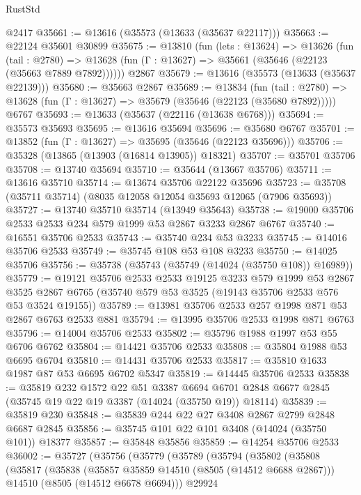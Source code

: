 \begin{lexlean}{RustStd}
\begin{coremodule}
    @2417
@35661 := @13616 (@35573 (@13633 (@35637 @22117)))
@35663 := @22124 @35601 @30899
@35675 := @13810
    (fun (lets : @13624) =>
    @13626
      (fun (tail : @2780) =>
      @13628 (fun (Γ : @13627) => @35661 (@35646 (@22123 (@35663 @7889 @7892))))))
    @2867
@35679 := @13616 (@35573 (@13633 (@35637 @22139)))
@35680 := @35663 @2867
@35689 := @13834
    (fun (tail : @2780) => @13628 (fun (Γ : @13627) => @35679 (@35646 (@22123 (@35680 @7892)))))
    @6767
@35693 := @13633 (@35637 (@22116 (@13638 @6768)))
@35694 := @35573 @35693
@35695 := @13616 @35694
@35696 := @35680 @6767
@35701 := @13852 (fun (Γ : @13627) => @35695 (@35646 (@22123 @35696)))
@35706 := @35328 (@13865 (@13903 (@16814 @13905)) @18321)
@35707 := @35701 @35706
@35708 := @13740 @35694
@35710 := @35644 (@13667 @35706)
@35711 := @13616 @35710
@35714 := @13674 @35706 @22122 @35696
@35723 := @35708 (@35711 @35714) (@8035 @12058 @12054 @35693 @12065 (@7906 @35693))
@35727 := @13740 @35710 @35714 (@13949 @35643)
@35738 := @19000 @35706 @2533 @2533 @234 @579 @1999 @53 @2867 @3233 @2867 @6767
@35740 := @16551 @35706 @2533
@35743 := @35740 @234 @53 @3233
@35745 := @14016 @35706 @2533
@35749 := @35745 @108 @53 @108 @3233
@35750 := @14025 @35706
@35756 := @35738 (@35743 (@35749 (@14024 (@35750 @108)) @16989))
@35779 := @19121
    @35706
    @2533
    @2533
    @19125
    @3233
    @579
    @1999
    @53
    @2867
    @3525
    @2867
    @6765
    (@35740 @579 @53 @3525 (@19143 @35706 @2533 @576 @53 @3524 @19155))
@35789 := @13981 @35706 @2533 @257 @1998 @871 @53 @2867 @6763 @2533 @881
@35794 := @13995 @35706 @2533 @1998 @871 @6763
@35796 := @14004 @35706 @2533
@35802 := @35796 @1988 @1997 @53 @55 @6706 @6762
@35804 := @14421 @35706 @2533
@35808 := @35804 @1988 @53 @6695 @6704
@35810 := @14431 @35706 @2533
@35817 := @35810 @1633 @1987 @87 @53 @6695 @6702 @5347
@35819 := @14445 @35706 @2533
@35838 := @35819
    @232
    @1572
    @22
    @51
    @3387
    @6694
    @6701
    @2848
    @6677
    @2845
    (@35745 @19 @22 @19 @3387 (@14024 (@35750 @19)) @18114)
@35839 := @35819 @230
@35848 := @35839 @244 @22 @27 @3408 @2867 @2799 @2848 @6687 @2845
@35856 := @35745 @101 @22 @101 @3408 (@14024 (@35750 @101)) @18377
@35857 := @35848 @35856
@35859 := @14254 @35706 @2533
@36002 := @35727
    (@35756
      (@35779
        (@35789
          (@35794
            (@35802
              (@35808
                (@35817
                  (@35838
                    (@35857 @35859 @14510 (@8505 (@14512 @6688 @2867)))
                    @14510
                    (@8505 (@14512 @6678 @6694)))
                  @29924

\end{coremodule}
\end{lexlean}
